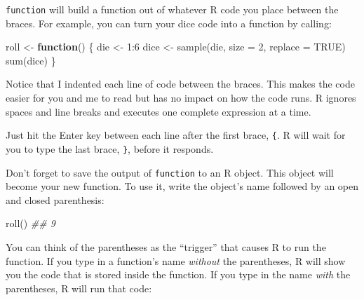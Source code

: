 \documentclass[
  letterpaper,
  DIV=11,
  numbers=noendperiod]{scrbook}
\newenvironment{Shaded}{\begin{snugshade}}{\end{snugshade}}
\newcommand{\AttributeTok}[1]{\textcolor[rgb]{0.40,0.45,0.13}{#1}}
\newcommand{\ConstantTok}[1]{\textcolor[rgb]{0.56,0.35,0.01}{#1}}
\newcommand{\ControlFlowTok}[1]{\textcolor[rgb]{0.00,0.23,0.31}{\textbf{#1}}}
\newcommand{\DecValTok}[1]{\textcolor[rgb]{0.68,0.00,0.00}{#1}}
\newcommand{\DocumentationTok}[1]{\textcolor[rgb]{0.37,0.37,0.37}{\textit{#1}}}
\newcommand{\FunctionTok}[1]{\textcolor[rgb]{0.28,0.35,0.67}{#1}}
\newcommand{\NormalTok}[1]{\textcolor[rgb]{0.00,0.23,0.31}{#1}}
\newcommand{\OtherTok}[1]{\textcolor[rgb]{0.00,0.23,0.31}{#1}}
\newcommand{\SpecialCharTok}[1]{\textcolor[rgb]{0.37,0.37,0.37}{#1}}
\begin{document}
\texttt{function} will build a function out of whatever R code you place
between the braces. For example, you can turn your dice code into a
function by calling:

\begin{Shaded}
\begin{Highlighting}[]
\NormalTok{roll }\OtherTok{\textless{}{-}} \ControlFlowTok{function}\NormalTok{() \{}
\NormalTok{  die }\OtherTok{\textless{}{-}} \DecValTok{1}\SpecialCharTok{:}\DecValTok{6}
\NormalTok{  dice }\OtherTok{\textless{}{-}} \FunctionTok{sample}\NormalTok{(die, }\AttributeTok{size =} \DecValTok{2}\NormalTok{, }\AttributeTok{replace =} \ConstantTok{TRUE}\NormalTok{)}
  \FunctionTok{sum}\NormalTok{(dice)}
\NormalTok{\}}
\end{Highlighting}
\end{Shaded}

\begin{tcolorbox}[enhanced jigsaw, breakable, colback=white, colbacktitle=quarto-callout-note-color!10!white, arc=.35mm, bottomrule=.15mm, coltitle=black, left=2mm, rightrule=.15mm, colframe=quarto-callout-note-color-frame, leftrule=.75mm, opacitybacktitle=0.6, bottomtitle=1mm, toptitle=1mm, titlerule=0mm, opacityback=0, title=\textcolor{quarto-callout-note-color}{\faInfo}\hspace{0.5em}{Note}, toprule=.15mm]

Notice that I indented each line of code between the braces. This makes
the code easier for you and me to read but has no impact on how the code
runs. R ignores spaces and line breaks and executes one complete
expression at a time.

\end{tcolorbox}

Just hit the Enter key between each line after the first brace,
\texttt{\{}. R will wait for you to type the last brace, \texttt{\}},
before it responds.

Don't forget to save the output of \texttt{function} to an R object.
This object will become your new function. To use it, write the object's
name followed by an open and closed parenthesis:

\begin{Shaded}
\begin{Highlighting}[]
\FunctionTok{roll}\NormalTok{()}
\DocumentationTok{\#\# 9}
\end{Highlighting}
\end{Shaded}

You can think of the parentheses as the ``trigger'' that causes R to run
the function. If you type in a function's name \emph{without} the
parentheses, R will show you the code that is stored inside the
function. If you type in the name \emph{with} the parentheses, R will
run that code:
\end{document}
